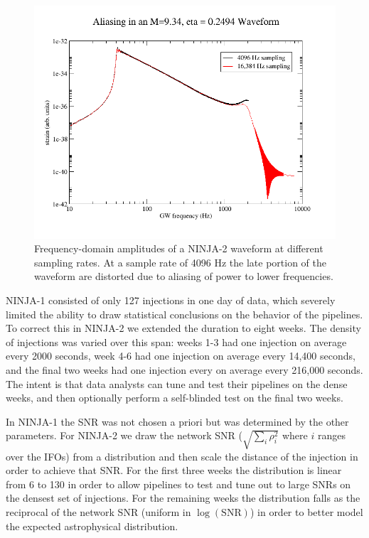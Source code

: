 \begin{figure}
  \includegraphics[width=\linewidth]{figures/ninja2_results/ninja2_aliasing}
  \caption[Aliasing of waveform power]{
  \label{f:ninja2_aliasing}
Frequency-domain amplitudes of a NINJA-2 waveform at different
sampling rates.  At a sample rate of 4096 Hz the late portion of the
waveform are distorted due to aliasing of power to lower frequencies.
}
\end{figure}%
%
NINJA-1 consisted of only 127 injections in one day of data, which
severely limited the ability to draw statistical conclusions on the
behavior of the pipelines.  To correct this in NINJA-2 we extended the
duration to eight weeks.  The density of injections was varied over
this span:  weeks 1-3 had one injection on average every 2000 seconds,
week 4-6 had one injection on average every 14,400 seconds, and the
final two weeks had one injection every on average every 216,000
seconds.  The intent is that data analysts can tune and test their
pipelines on the dense weeks, and then optionally perform a
self-blinded test on the final two weeks.

In NINJA-1 the SNR was not chosen a priori but was determined by the
other parameters.  For NINJA-2 we draw the network SNR ($\sqrt{\sum_i
\rho_i^2}$ where $i$ ranges over the IFOs) from a distribution and
then scale the distance of the injection in order to achieve that SNR.
For the first three weeks the distribution is linear from 6 to 130 in
order to allow pipelines to test and tune out to large SNRs on the
densest set of injections.  For the remaining weeks the distribution
falls as the reciprocal of the network SNR (uniform in
$\log(\mathrm{SNR})$) in order to better model the expected
astrophysical distribution.

